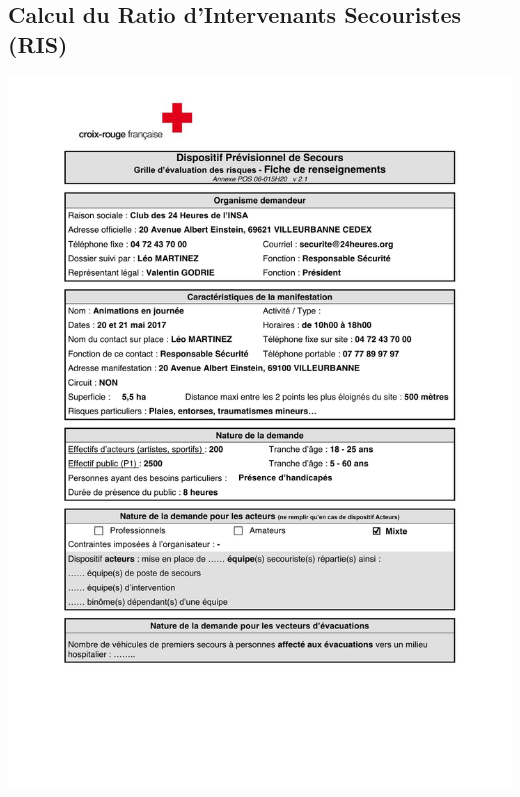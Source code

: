 \documentclass[hidelinks, paper=a4, fontsize=13pt]{report}
\begin{document}
\subsection{Calcul du Ratio d’Intervenants Secouristes (RIS)}
\begin{center}
	\includegraphics[scale=0.70, page=1]{Annexes/Documents/Fiche_RIS_Animations_2017}
\end{center}
\end{document}
